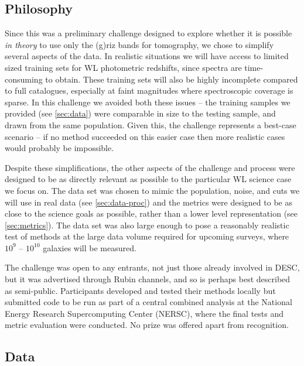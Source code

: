 \documentclass[twocolumn,twocolappendix]{aastex63}
\begin{document}
\subsection{Philosophy}

Since this was a preliminary challenge designed to explore whether it is possible \emph{in theory}
to use only the (g)riz bands for tomography, we chose to simplify several aspects of the data.  In realistic 
situations we will have access to limited sized training sets for WL photometric redshifts, since 
spectra are time-consuming to obtain.  These training sets will also be highly incomplete compared
to full catalogues, especially at faint magnitudes where spectroscopic coverage is sparse.  In this
challenge we avoided both these issues -- the training samples we provided (see \autoref{sec:data}) were comparable
in size to the testing sample, and drawn from the same population.  Given this, the challenge
represents a best-case scenario -- if no method succeeded on this easier case then more realistic
cases would probably be impossible.

Despite these simplifications, the other aspects of the challenge and process were designed to be
as directly relevant as possible to the particular WL science case we focus on.  The data set
was chosen to mimic the population, noise, and cuts we will use in real data (see \autoref{sec:data-proc}) 
and the metrics were designed to be as close to the science goals as possible, rather than a lower
level representation (see \autoref{sec:metrics}). The data set was also large enough to pose a 
reasonably realistic test of methods at the large data volume required for upcoming surveys, where
$10^9$ -- $10^{10}$ galaxies will be measured.

The challenge was open to any entrants, not just those already involved in DESC, but it was
advertised through Rubin channels, and so is perhaps best described as semi-public.
Participants developed and tested their methods locally but submitted code to be run as part of a central
combined analysis at the National Energy Research
Supercomputing Center (NERSC), where the final tests and metric evaluation were conducted.  No prize was offered apart from recognition.

\subsection{Data}
\label{sec:data}
\end{document}

